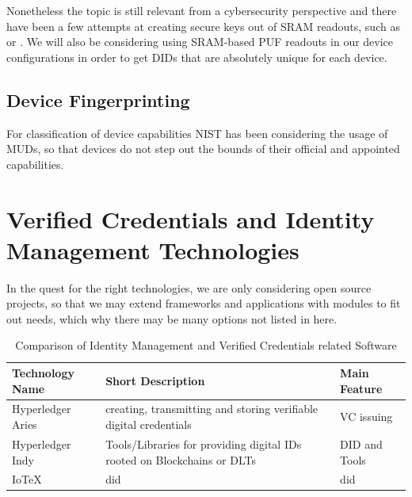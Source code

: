 Nonetheless the topic is still relevant from a cybersecurity perspective and there have been a few attempts at creating
secure keys out of SRAM readouts, such as \cite{vinagrero2023sram} or \cite{Niya_Jeffrey_Stiller_2020}.
We will also be considering using SRAM-based PUF readouts in our device configurations in order to get DIDs that are
absolutely unique for each device.

\subsection{Device Fingerprinting} %
\label{sub:Device Fingerprinting}
For classification of device capabilities NIST has been considering the usage of MUDs, so that devices do not step out
the bounds of their official and appointed capabilities. \cite{dodson2021securing}


\section{Verified Credentials and Identity Management Technologies} %
\label{sub:Verified Credentials and Identity Management Technologies}

In the quest for the right technologies, we are only considering open source projects, so that we may extend frameworks
and applications with modules to fit out needs, which why there may be many options not listed in here.

\begin{table}
	\caption{Comparison of Identity Management and Verified Credentials related Software}
	\label{tab:Comparison of Identity Management and Verified Credentials related Software}
	\begin{center}
		\begin{tabular}[c]{|l|p{7cm}|l|}
			\hline
			\textbf{Technology Name}                  & Short Description                             & Main Feature \\
			\hline
			Hyperledger Aries \cite{hyperledger:wiki} & creating, transmitting and storing verifiable
			digital credentials                       & VC issuing                                                   \\
			\hline
			Hyperledger Indy \cite{hyperledger:wiki}  & Tools/Libraries for providing digital IDs
			rooted on Blockchains or DLTs             & DID and Tools                                                \\
			\hline
			IoTeX \cite{iotex-bc-platform}            & did                                           & did          \\
			\hline
		\end{tabular}
	\end{center}
\end{table}

